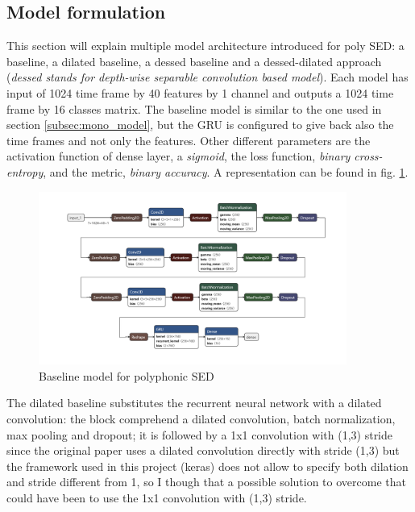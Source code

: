 \documentclass{article}
\begin{document}
\subsection{Model formulation}
\label{subsec:poly_model}

This section will explain multiple model architecture introduced for poly SED: a baseline, a dilated baseline, a dessed baseline and a dessed-dilated approach (\textit{dessed stands for depth-wise separable convolution based model}). Each model has input of 1024 time frame by 40 features by 1 channel and outputs a 1024 time frame by 16 classes matrix.\newline
The baseline model is similar to the one used in section \ref{subsec:mono_model}, but the GRU is configured to give back also the time frames and not only the features. Other different parameters are the activation function of dense layer, a \textit{sigmoid}, the loss function, \textit{binary cross-entropy}, and the metric, \textit{binary accuracy}. A representation can be found in fig. \ref{fig:poly_baseline}.

\begin{figure}[H]
	\centering
	\includegraphics[width=0.9\textwidth]{./images/poly/baseline.png}	
	\caption{Baseline model for polyphonic SED}
	\label{fig:poly_baseline}
\end{figure}

The dilated baseline substitutes the recurrent neural network with a dilated convolution: the block comprehend a dilated convolution, batch normalization, max pooling and dropout; it is followed by a 1x1 convolution with (1,3) stride since the original paper \cite{drossos2020sound} uses a dilated convolution directly with stride (1,3) but the framework used in this project (keras) does not allow to specify both dilation and stride different from 1, so I though that a possible solution to overcome that could have been to use the 1x1 convolution with (1,3) stride. 
\end{document}

